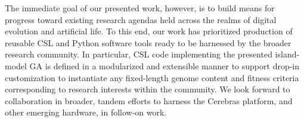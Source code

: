 The immediate goal of our presented work, however, is to build means for progress toward existing research agendas held across the realms of digital evolution and artificial life.
To this end, our work has prioritized production of reusable CSL and Python software tools ready to be harnessed by the broader research community.
In particular, CSL code implementing the presented island-model GA is defined in a modularized and extensible manner to support drop-in customization to instantiate any fixed-length genome content and fitness criteria corresponding to research interests within the community.
We look forward to collaboration in broader, tandem efforts to harness the Cerebras platform, and other emerging hardware, in follow-on work.







